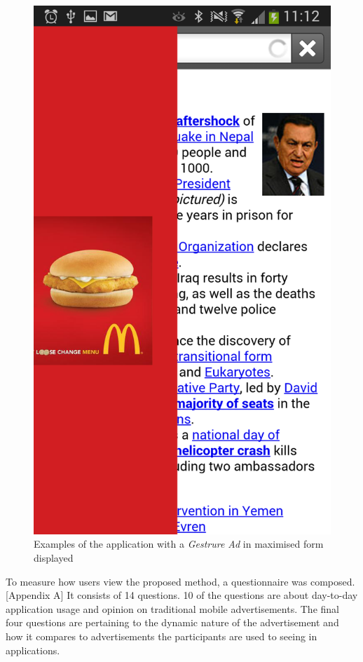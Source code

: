 \begin{figure}
\begin{center}
\includegraphics[scale=0.25]{Images/gesturead_big2.png}
\caption{Examples of the application with a \textit{Gestrure Ad} in maximised form displayed}
\label{fig:ads3}
\end{center}
\end{figure}

To measure how users view the proposed method, a questionnaire was composed. [Appendix A] It consists of 14 questions. 10 of the questions are about day-to-day application usage and opinion on traditional mobile advertisements. The final four questions are pertaining to the dynamic nature of the advertisement and how it compares to advertisements the participants are used to seeing in applications.


